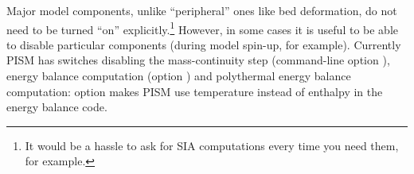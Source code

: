 Major model components, unlike ``peripheral'' ones like bed deformation, do not need to be turned ``on'' explicitly.\footnote{It would be a hassle to ask for SIA computations every time you need them, for example.} However, in some cases it is useful to be able to disable particular components (during model spin-up, for example). Currently PISM has switches disabling the mass-continuity step (command-line option ), energy balance computation (option ) and polythermal energy balance computation: option  makes PISM use temperature instead of enthalpy in the energy balance code.


